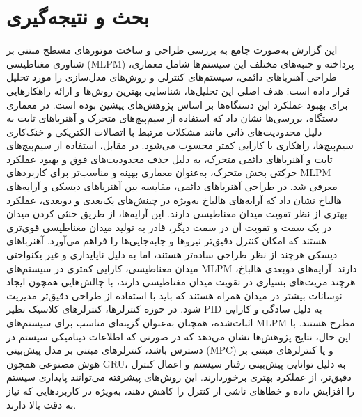 \chapter{بحث و نتیجه‌گیری}


این گزارش به‌صورت جامع به بررسی طراحی و ساخت موتورهای مسطح مبتنی بر شناوری مغناطیسی (MLPM) پرداخته و جنبه‌های مختلف این سیستم‌ها شامل معماری، طراحی آهنرباهای دائمی، سیستم‌های کنترلی و روش‌های مدل‌سازی را مورد تحلیل قرار داده است. هدف اصلی این تحلیل‌ها، شناسایی بهترین روش‌ها و ارائه راهکارهایی برای بهبود عملکرد این دستگاه‌ها بر اساس پژوهش‌های پیشین بوده است.
در معماری دستگاه، بررسی‌ها نشان داد که استفاده از سیم‌پیچ‌های متحرک و آهنرباهای ثابت به دلیل محدودیت‌های ذاتی مانند مشکلات مرتبط با اتصالات الکتریکی و خنک‌کاری سیم‌پیچ‌ها، راهکاری با کارایی کمتر محسوب می‌شود. در مقابل، استفاده از سیم‌پیچ‌های ثابت و آهنرباهای دائمی متحرک، به دلیل حذف محدودیت‌های فوق و بهبود عملکرد حرکتی بخش متحرک، به‌عنوان معماری بهینه و مناسب‌تر برای کاربردهای MLPM معرفی شد.
در طراحی آهنرباهای دائمی، مقایسه بین آهنرباهای دیسکی و آرایه‌های هالباخ نشان داد که آرایه‌های هالباخ به‌ویژه در چینش‌های یک‌بعدی و دوبعدی، عملکرد بهتری از نظر تقویت میدان مغناطیسی دارند. این آرایه‌ها، از طریق خنثی کردن میدان در یک سمت و تقویت آن در سمت دیگر، قادر به تولید میدان مغناطیسی قوی‌تری هستند که امکان کنترل دقیق‌تر نیروها و جابه‌جایی‌ها را فراهم می‌آورد. آهنرباهای دیسکی هرچند از نظر طراحی ساده‌تر هستند، اما به دلیل ناپایداری و غیر یکنواختی میدان مغناطیسی، کارایی کمتری در سیستم‌های MLPM دارند. آرایه‌های دوبعدی هالباخ، هرچند مزیت‌های بسیاری در تقویت میدان مغناطیسی دارند، با چالش‌هایی همچون ایجاد نوسانات بیشتر در میدان همراه هستند که باید با استفاده از طراحی دقیق‌تر مدیریت شود.
در حوزه کنترلرها، کنترلرهای کلاسیک نظیر PID به دلیل سادگی و کارایی اثبات‌شده، همچنان به‌عنوان گزینه‌ای مناسب برای سیستم‌های MLPM مطرح هستند. با این حال، نتایج پژوهش‌ها نشان می‌دهد که در صورتی که اطلاعات دینامیکی سیستم در دسترس باشد، کنترلرهای مبتنی بر مدل پیش‌بینی (MPC) و یا کنترلرهای مبتنی بر هوش مصنوعی همچون GRU، به دلیل توانایی پیش‌بینی رفتار سیستم و اعمال کنترل دقیق‌تر، از عملکرد بهتری برخوردارند. این روش‌های پیشرفته می‌توانند پایداری سیستم را افزایش داده و خطاهای ناشی از کنترل را کاهش دهند، به‌ویژه در کاربردهایی که نیاز به دقت بالا دارند.

